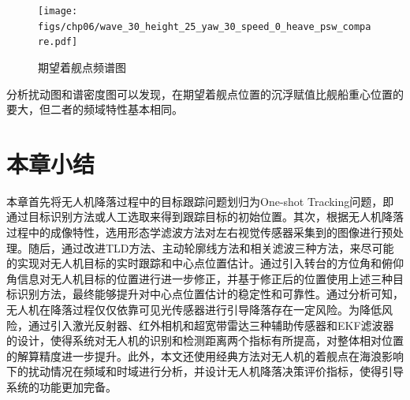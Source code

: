 \begin{figure}[!ht]
	\centering
	\texttt{[image: figs/chp06/wave\_30\_height\_25\_yaw\_30\_speed\_0\_heave\_psw\_compare.pdf]}	
	\caption{期望着舰点频谱图}
	\label{fig:wave_30_height_25_yaw_30_speed_0_heave_psw_compare}
\end{figure}
分析扰动图和谱密度图可以发现，在期望着舰点位置的沉浮赋值比舰船重心位置的要大，但二者的频域特性基本相同。


\section{本章小结}
本章首先将无人机降落过程中的目标跟踪问题划归为One-shot Tracking问题，即通过目标识别方法或人工选取来得到跟踪目标的初始位置。其次，根据无人机降落过程中的成像特性，选用形态学滤波方法对左右视觉传感器采集到的图像进行预处理。随后，通过改进TLD方法、主动轮廓线方法和相关滤波三种方法，来尽可能的实现对无人机目标的实时跟踪和中心点位置估计。通过引入转台的方位角和俯仰角信息对无人机目标的位置进行进一步修正，并基于修正后的位置使用上述三种目标识别方法，最终能够提升对中心点位置估计的稳定性和可靠性。通过分析可知，无人机在降落过程仅仅依靠可见光传感器进行引导降落存在一定风险。为降低风险，通过引入激光反射器、红外相机和超宽带雷达三种辅助传感器和EKF滤波器的设计，使得系统对无人机的识别和检测距离两个指标有所提高，对整体相对位置的解算精度进一步提升。此外，本文还使用经典方法对无人机的着舰点在海浪影响下的扰动情况在频域和时域进行分析，并设计无人机降落决策评价指标，使得引导系统的功能更加完备。

